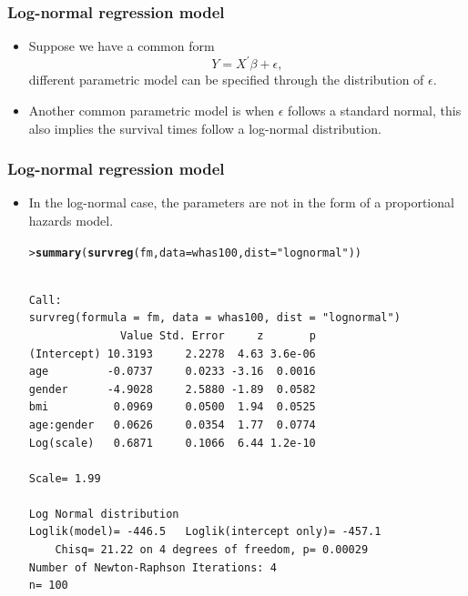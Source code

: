 \documentclass[10pt]{beamer}\usepackage[]{graphicx}\usepackage[]{color}
\makeatletter
\newcommand{\hlstr}[1]{\textcolor[rgb]{0.192,0.494,0.8}{#1}}%
\newcommand{\hlstd}[1]{\textcolor[rgb]{0.345,0.345,0.345}{#1}}%
\newcommand{\hlkwc}[1]{\textcolor[rgb]{0.333,0.667,0.333}{#1}}%
\newcommand{\hlkwd}[1]{\textcolor[rgb]{0.737,0.353,0.396}{\textbf{#1}}}%
\newenvironment{kframe}{%
 \def\at@end@of@kframe{}%
 \ifinner\ifhmode%
  \def\at@end@of@kframe{\end{minipage}}%
  \begin{minipage}{\columnwidth}%
 \fi\fi%
 \def\FrameCommand##1{\hskip\@totalleftmargin \hskip-\fboxsep
 \colorbox{shadecolor}{##1}\hskip-\fboxsep
     \hskip-\linewidth \hskip-\@totalleftmargin \hskip\columnwidth}%
 \MakeFramed {\advance\hsize-\width
   \@totalleftmargin\z@ \linewidth\hsize
   \@setminipage}}%
 {\par\unskip\endMakeFramed%
 \at@end@of@kframe}
\newenvironment{knitrout}{}{} %
\renewenvironment{knitrout}{\setlength{\topsep}{-.2mm}}{}
\makeatother
\begin{document}
\begin{frame}[fragile]
  \frametitle{Log-normal regression model}
  \begin{itemize}
  \item Suppose we have a common form
    $$ Y = X^\prime\beta + \epsilon,$$
    different parametric model can be specified through the distribution of $\epsilon$.
  \item Another common parametric model is when $\epsilon$ follows a standard normal,
    this also implies the survival times follow a log-normal distribution.
  \end{itemize}
\end{frame}

\begin{frame}[fragile]
  \frametitle{Log-normal regression model}
  \begin{itemize}
  \item In the log-normal case, the parameters are not in the form of a proportional hazards model.
\begin{knitrout}\scriptsize
{}\color{fgcolor}\begin{kframe}
\begin{alltt}
\hlstd{> }\hlkwd{summary}\hlstd{(}\hlkwd{survreg}\hlstd{(fm,} \hlkwc{data} \hlstd{= whas100,} \hlkwc{dist} \hlstd{=} \hlstr{"lognormal"}\hlstd{))}
\end{alltt}
\begin{verbatim}

Call:
survreg(formula = fm, data = whas100, dist = "lognormal")
              Value Std. Error     z       p
(Intercept) 10.3193     2.2278  4.63 3.6e-06
age         -0.0737     0.0233 -3.16  0.0016
gender      -4.9028     2.5880 -1.89  0.0582
bmi          0.0969     0.0500  1.94  0.0525
age:gender   0.0626     0.0354  1.77  0.0774
Log(scale)   0.6871     0.1066  6.44 1.2e-10

Scale= 1.99 

Log Normal distribution
Loglik(model)= -446.5   Loglik(intercept only)= -457.1
	Chisq= 21.22 on 4 degrees of freedom, p= 0.00029 
Number of Newton-Raphson Iterations: 4 
n= 100 
\end{verbatim}
\end{kframe}
\end{knitrout}
  \end{itemize}
\end{frame}
\end{document}
